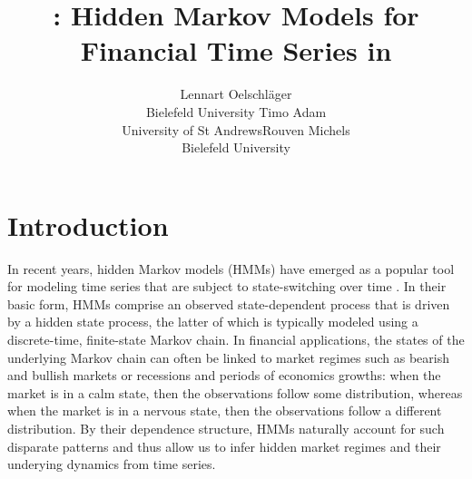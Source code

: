 \documentclass[article]{jss}
\author{Lennart Oelschl\"ager \\Bielefeld University \And Timo Adam \\University of St Andrews\And Rouven Michels \\Bielefeld University}
\title{\pkg{fHMM}: Hidden Markov Models for Financial Time Series in \proglang{R}}
\newcommand{\fct}[1]{\code{#1()}}
\begin{document}



\section{Introduction}
\label{sec:intro} %


In recent years, hidden Markov models (HMMs) have emerged as a popular tool for modeling time series that are subject to state-switching over time \citep{zuc16}. In their basic form, HMMs comprise an observed state-dependent process that is driven by a hidden state process, the latter of which is typically modeled using a discrete-time, finite-state Markov chain. In financial applications, the states of the underlying Markov chain can often be linked to market regimes such as bearish and bullish markets or recessions and periods of economics growths: when the market is in a calm state, then the observations follow some distribution, whereas when the market is in a nervous state, then the observations follow a different distribution. By their dependence structure, HMMs naturally account for such disparate patterns and thus allow us to infer hidden market regimes and their underying dynamics from time series.
\end{document}
